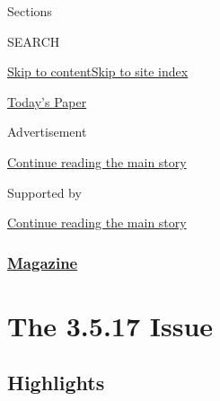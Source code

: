Sections

SEARCH

\protect\hyperlink{site-content}{Skip to
content}\protect\hyperlink{site-index}{Skip to site index}

\href{https://myaccount.nytimes3xbfgragh.onion/auth/login?response_type=cookie\&client_id=vi}{}

\href{https://www.nytimes3xbfgragh.onion/section/todayspaper}{Today's
Paper}

Advertisement

\protect\hyperlink{after-top}{Continue reading the main story}

Supported by

\protect\hyperlink{after-sponsor}{Continue reading the main story}

\hypertarget{magazine}{%
\subsubsection{\texorpdfstring{\href{/section/magazine}{Magazine}}{Magazine}}\label{magazine}}

\hypertarget{the-3517-issue}{%
\section{The 3.5.17 Issue}\label{the-3517-issue}}

\hypertarget{highlights}{%
\subsection{Highlights}\label{highlights}}

